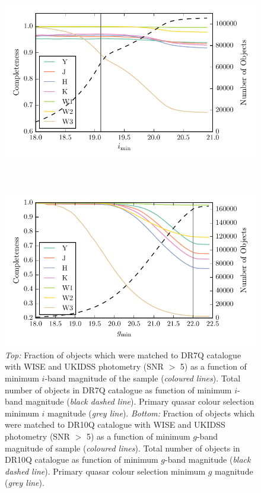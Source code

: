 \begin{figure}
  \centering
  \begin{minipage}[b]{0.75\textwidth}
    \includegraphics[width=\textwidth]{figures/chapter06/dr7completeness.pdf}
  \end{minipage} \\
  \begin{minipage}[b]{0.75\textwidth}
    \includegraphics[width=\textwidth]{figures/chapter06/dr10completeness.pdf}
  \end{minipage}
  \caption{{\it Top:} Fraction of objects which were matched to DR7Q catalogue with WISE and UKIDSS photometry (SNR $>$ 5) as a function of minimum $i$-band magnitude of the sample ({\it coloured lines}). Total number of objects in DR7Q catalogue as function of minimum $i$-band magnitude ({\it black dashed line}). Primary quasar colour selection minimum $i$ magnitude ({\it grey line}). {\it Bottom:} Fraction of objects which were matched to DR10Q catalogue with WISE and UKIDSS photometry (SNR $>$ 5) as a function of minimum $g$-band magnitude of sample ({\it coloured lines}). Total number of objects in DR10Q catalogue as function of minimum $g$-band magnitude ({\it black dashed line}). Primary quasar colour selection minimum $g$ magnitude ({\it grey line}).}
  \label{fig:completeness}
\end{figure}

